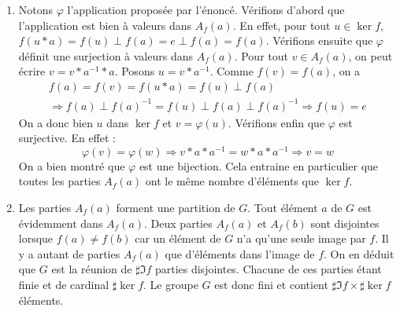 \begin{enumerate}
 \item Notons $\varphi$ l'application proposée par l'énoncé. Vérifions d'abord que l'application est bien à valeurs dans $A_f(a)$. En effet, pour tout $u\in \ker f$, $f(u*a)=f(u)\perp f(a) = e\perp f(a)=f(a)$.\newline
Vérifions ensuite que $\varphi$ définit une surjection à valeurs dans $A_f(a)$. Pour tout $v\in A_f(a)$, on peut écrire $v=v*a^{-1}*a$. Posons $u=v*a^{-1}$. Comme $f(v)=f(a)$, on a 
\begin{multline*}
 f(a)=f(v)=f(u*a)=f(u)\perp f(a)\\
\Rightarrow f(a)\perp f(a)^{-1}=f(u)\perp f(a)\perp f(a)^{-1}\Rightarrow f(u)=e
\end{multline*}
On a donc bien $u$ dans $\ker f$ et $v=\varphi(u)$.\newline
Vérifions enfin que $\varphi$ est surjective. En effet :
\begin{displaymath}
 \varphi(v)=\varphi(w)\Rightarrow v*a*a^{-1}=w*a*a^{-1}\Rightarrow v=w
\end{displaymath}
On a bien montré que $\varphi$ est une bijection. Cela entraine en particulier que toutes les parties $A_f(a)$ ont le même nombre d'éléments que $\ker f$. 
 \item Les parties $A_f(a)$ forment une partition de $G$. Tout élément $a$ de $G$ est évidemment dans $A_f(a)$. Deux parties $A_f(a)$ et $A_f(b)$ sont disjointes lorsque $f(a)\neq f(b)$ car un élément de $G$ n'a qu'une seule image par $f$. Il y a autant de parties $A_f(a)$ que d'éléments dans l'image de $f$.\newline
On en déduit que $G$ est la réunion de $\sharp \Im f$ parties disjointes. Chacune de ces parties étant finie et de cardinal $\sharp \ker f$.\newline
Le groupe $G$ est donc fini et contient $\sharp\Im f\times \sharp\ker f$ éléments.
\end{enumerate}
